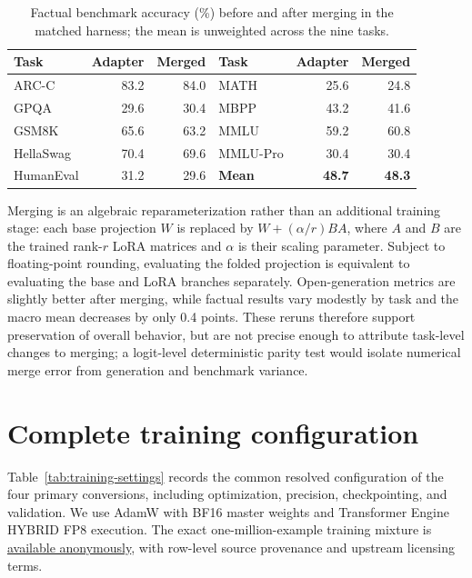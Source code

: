 \documentclass{article}
\begin{document}
\begin{table}[h]
\caption{Factual benchmark accuracy (\%) before and after merging in the matched harness; the mean is unweighted across the nine tasks.}
\label{tab:merge-benchmarks}
\centering
\small
\begin{tabular}{lrr@{\qquad}lrr}
\toprule
Task & Adapter & Merged & Task & Adapter & Merged \\
\midrule
ARC-C      & 83.2 & 84.0 & MATH     & 25.6 & 24.8 \\
GPQA       & 29.6 & 30.4 & MBPP     & 43.2 & 41.6 \\
GSM8K      & 65.6 & 63.2 & MMLU     & 59.2 & 60.8 \\
HellaSwag  & 70.4 & 69.6 & MMLU-Pro & 30.4 & 30.4 \\
HumanEval  & 31.2 & 29.6 & \textbf{Mean} & \textbf{48.7} & \textbf{48.3} \\
\bottomrule
\end{tabular}
\end{table}

Merging is an algebraic reparameterization rather than an additional training stage: each base projection $W$ is replaced by $W+(\alpha/r)BA$, where $A$ and $B$ are the trained rank-$r$ LoRA matrices and $\alpha$ is their scaling parameter. Subject to floating-point rounding, evaluating the folded projection is equivalent to evaluating the base and LoRA branches separately. Open-generation metrics are slightly better after merging, while factual results vary modestly by task and the macro mean decreases by only 0.4 points. These reruns therefore support preservation of overall behavior, but are not precise enough to attribute task-level changes to merging; a logit-level deterministic parity test would isolate numerical merge error from generation and benchmark variance.

\section{Complete training configuration}
\label{app:training-settings}

Table~\ref{tab:training-settings} records the common resolved configuration of the four primary conversions, including optimization, precision, checkpointing, and validation. We use AdamW with BF16 master weights and Transformer Engine HYBRID FP8 execution. The exact one-million-example training mixture is \href{https://huggingface.co/datasets/Dovelove/BYOD-training-1m-256}{available anonymously}, with row-level source provenance and upstream licensing terms.
\end{document}
